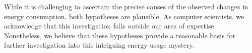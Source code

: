 While it is challenging to ascertain the precise causes of the observed changes in energy consumption, both hypotheses are plausible. As computer scientists, we acknowledge that this investigation falls outside our area of expertise. Nonetheless, we believe that these hypotheses provide a reasonable basis for further investigation into this intriguing energy usage mystery.